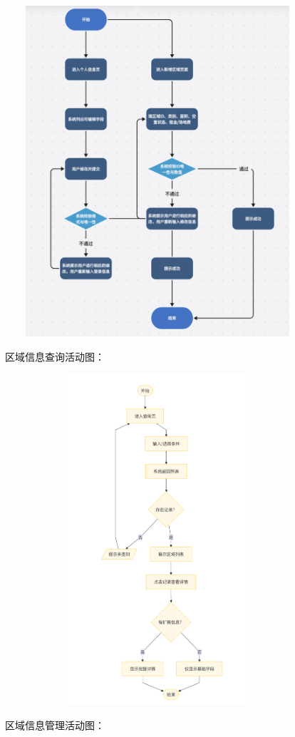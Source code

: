 \documentclass[]{article}
\begin{document}
\includegraphics[width=4.45694in,height=4.83819in]{media/media/image_2-3-1.png}

区域信息查询活动图：

\includegraphics[width=4.45694in,height=4.83819in]{media/media/image_2-3-2.png}

区域信息管理活动图：
\end{document}
